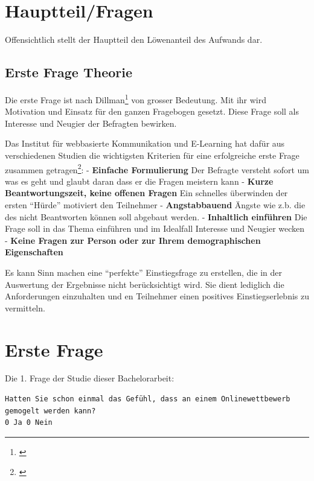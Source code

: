 \newpage

\section{Hauptteil/Fragen}\label{hauptteilfragen}

Offensichtlich stellt der Hauptteil den Löwenanteil des Aufwands dar.

\subsection{Erste Frage Theorie}\label{erste-frage-theorie}

Die erste Frage ist nach Dillman\footnote{\autocite{dillman}} von
grosser Bedeutung. Mit ihr wird Motivation und Einsatz für den ganzen
Fragebogen gesetzt. Diese Frage soll als Interesse und Neugier der
Befragten bewirken.

Das Institut für webbasierte Kommunikation und E-Learning hat dafür aus
verschiedenen Studien die wichtigsten Kriterien für eine erfolgreiche
erste Frage zusammen getragen\footnote{\autocite{fragebogen}}: -
\textbf{Einfache Formulierung} Der Befragte versteht sofort um was es
geht und glaubt daran dass er die Fragen meistern kann - \textbf{Kurze
Beantwortungszeit, keine offenen Fragen} Ein schnelles überwinden der
ersten ``Hürde'' motiviert den Teilnehmer - \textbf{Angstabbauend}
Ängste wie z.b. die des nicht Beantworten können soll abgebaut werden. -
\textbf{Inhaltlich einführen} Die Frage soll in das Thema einführen und
im Idealfall Interesse und Neugier wecken - \textbf{Keine Fragen zur
Person oder zur Ihrem demographischen Eigenschaften}

Es kann Sinn machen eine ``perfekte'' Einstiegsfrage zu erstellen, die
in der Auswertung der Ergebnisse nicht berücksichtigt wird. Sie dient
lediglich die Anforderungen einzuhalten und en Teilnehmer einen
positives Einstiegserlebnis zu vermitteln.

\section{Erste Frage}\label{erste-frage}

Die 1. Frage der Studie dieser Bachelorarbeit:

\begin{verbatim}
Hatten Sie schon einmal das Gefühl, dass an einem Onlinewettbewerb 
gemogelt werden kann?
0 Ja 0 Nein
\end{verbatim}


